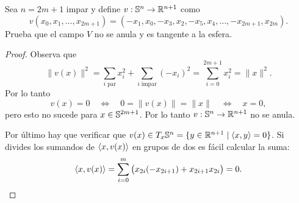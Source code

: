 \begin{ejercicio}\label{ej:80}
  Sea $n=2m+1$ impar y define $v:\mathbb{S}^n\rightarrow\mathbb{R}^{n+1}$ como
  \[
    v(x_0,x_1,\ldots,x_{2m+1})=(-x_1,x_0,-x_3,x_2,-x_5,x_4,\ldots,-x_{2m+1},x_{2m}).
  \]
  Prueba que el campo $V$ no se anula y es tangente a la esfera.
\end{ejercicio}
\begin{proof}%
  Observa que
  \[
    \|v(x)\|^2=\sum_{i\;\text{par}}x_i^2+\sum_{i\;\text{impar}}(-x_i)^2=\sum_{i=0}^{2m+1}x_i^2=\|x\|^2.
  \]
  Por lo tanto
  \[
    v(x)=0 \quad\iff\quad 0=\|v(x)\|=\|x\| \quad\iff\quad x=0,
  \]
  pero esto no sucede para $x\in\mathbb{S}^{2m+1}$. Por lo tanto $v:\mathbb{S}^{n}\rightarrow\mathbb{R}^{n+1}$ no se
  anula.

  Por \'ultimo hay que verificar que $v(x)\in T_x\mathbb{S}^n=\{y\in\mathbb{R}^{n+1}\mid\langle x,y \rangle=0\}$.
  Si divides los sumandos de $\langle x,v(x) \rangle$ en grupos de dos es f\'acil calcular la suma:
  \[
    \langle x,v(x) \rangle=\sum_{i=0}^{m}\big(x_{2i}(-x_{2i+1})+x_{2i+1}x_{2i}\big)=0.
  \] 
\end{proof}%

